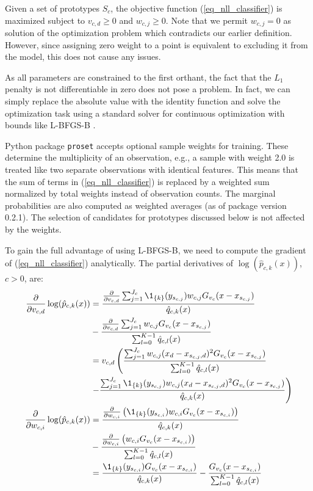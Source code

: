%
Given a set of prototypes $S_c$, the objective function (\ref{eq_nll_classifier}) is maximized subject to $v_{c,d}\geq0$ and $w_{c,j}\geq0$.
Note that we permit $w_{c,j}=0$ as solution of the optimization problem which contradicts our earlier definition.
However, since assigning zero weight to a point is equivalent to excluding it from the model, this does not cause any issues.\par
%
As all parameters are constrained to the first orthant, the fact that the $L_1$ penalty is not differentiable in zero does not pose a problem.
In fact, we can simply replace the absolute value with the identity function and solve the optimization task using a standard solver for continuous optimization with bounds like L-BFGS-B \cite{Byrd_95}.
%
\begin{remark}
Python package \texttt{proset} accepts optional sample weights for training.
These determine the multiplicity of an observation, e.g., a sample with weight 2.0 is treated like two separate observations with identical features.
This means that the sum of terms in (\ref{eq_nll_classifier}) is replaced by a weighted sum normalized by total weights instead of observation counts.
The marginal probabilities are also computed as weighted averages (as of package version 0.2.1).
The selection of candidates for prototypes discussed below is not affected by the weights.
\end{remark}
%
To gain the full advantage of using L-BFGS-B, we need to compute the gradient of (\ref{eq_nll_classifier}) analytically.
The partial derivatives of $\log(\hat{p}_{c,k}(x))$, $c>0$, are:
%
\begin{align}
\frac{\partial}{\partial v_{c,d}}\log(\hat{p}_{c,k}(x))&
=\frac{\frac{\partial}{\partial v_{c,d}}
\sum_{j=1}^{J_c}\1_{\{k\}}(y_{s_{c,j}})w_{c,j}G_{v_c}(x-x_{s_{c,j}})}
{\hat{q}_{c,k}(x)}
\label{eq_p_partial_v}\\
&-\frac{\frac{\partial}{\partial v_{c,d}}
\sum_{j=1}^{J_c}w_{c,j}G_{v_c}(x-x_{s_{c,j}})}
{\sum_{l=0}^{K-1}\hat{q}_{c,l}(x)}\notag\\
&=v_{c,d}\left(\frac{\sum_{j=1}^{J_c}w_{c,j}
(x_d-x_{s_{c,j},d})^2G_{v_c}(x-x_{s_{c,j}})}
{\sum_{l=0}^{K-1}\hat{q}_{c,l}(x)}\right.\notag\\
&\left.-\frac{\sum_{j=1}^{J_c}\1_{\{k\}}(y_{s_{c,j}})w_{c,j}
(x_d-x_{s_{c,j},d})^2G_{v_c}(x-x_{s_{c,j}})}
{\hat{q}_{c,k}(x)}\right)\notag\\
\frac{\partial}{\partial w_{c,i}}\log(\hat{p}_{c,k}(x))&
=\frac{\frac{\partial}{\partial w_{c,i}}
\left(\1_{\{k\}}(y_{s_{c,i}})w_{c,i}G_{v_c}(x-x_{s_{c,i}})\right)}
{\hat{q}_{c,k}(x)}
\label{eq_p_partial_w}\\
&-\frac{\frac{\partial}{\partial w_{c,i}}
\left(w_{c,i}G_{v_c}(x-x_{s_{c,i}})\right)}
{\sum_{l=0}^{K-1}\hat{q}_{c,l}(x)}\notag\\
&=\frac{\1_{\{k\}}(y_{s_{c,i}})G_{v_c}(x-x_{s_{c,i}})}
{\hat{q}_{c,k}(x)}
-\frac{G_{v_c}(x-x_{s_{c,i}})}
{\sum_{l=0}^{K-1}\hat{q}_{c,l}(x)}\notag
\end{align}
